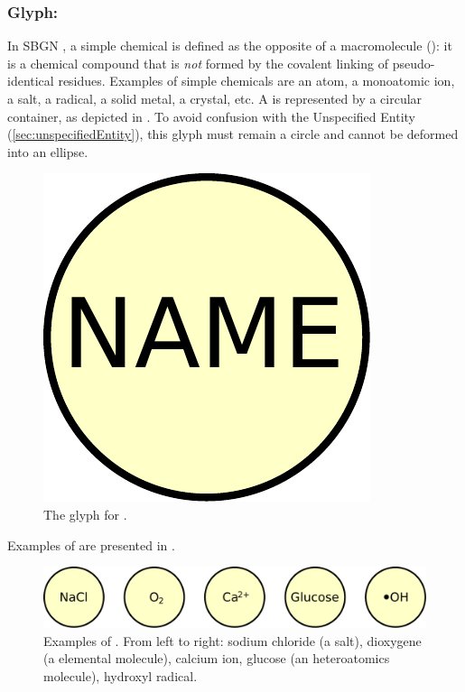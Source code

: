 \subsubsection{Glyph: }
\label{sec:simpleChemical}

In SBGN \PDs, a simple chemical is defined as the opposite of a macromolecule (): it is a chemical compound that is \emph{not} formed by the covalent linking of pseudo-identical residues.  Examples of simple chemicals are an atom, a monoatomic ion, a salt, a radical, a solid metal, a crystal, etc. A  is represented by a circular
container, as depicted in . To avoid confusion with the Unspecified Entity (\ref{sec:unspecifiedEntity}), this glyph must remain a circle and cannot be deformed into an ellipse.

\begin{figure}[H]
  \centering
  \includegraphics[scale = 0.3]{le_images/simpleChemical}
  \caption{The \PD glyph for .}
  \label{fig:simpleChemical}
\end{figure}

Examples of  are presented in .

\begin{figure}[H]
  \centering
  \includegraphics[scale = 0.5]{le_images/simpleChemical-examples}
  \caption{Examples of . From left to right: sodium chloride (a salt), dioxygene (a elemental molecule), calcium ion, glucose (an heteroatomics molecule), hydroxyl radical.}
  \label{fig:simpleChemical-examples}
\end{figure}

